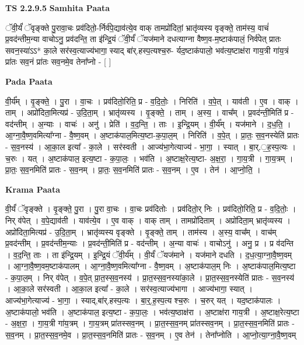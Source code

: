 \documentclass[17pt]{extarticle}
\begin{document}
\textbf{TS 2.2.9.5 } \newline
\textbf{Samhita Paata} \newline

ॅवी॒र्यं॑ ॅवृङ्क्ते पु॒रावा॒चः प्रव॑दितो॒-र्निर्व॑पे॒द्याव॑त्ये॒व वाक् तामप्रो॑दितां॒ भ्रातृ॑व्यस्य वृङ्क्ते॒ ताम॑स्य॒ वाचं॑ प्र॒वद॑न्तीम॒न्या वाचोऽनु॒ प्रव॑दन्ति॒ ता इ॑न्द्रि॒यं ॅवी॒र्यं॑ ॅयज॑माने दधत्याग्ना वैष्ण॒व-म॒ष्टाक॑पालं॒ निर्व॑पेत् प्रातः सवन॒स्या॑ऽऽ* का॒ले सर॑स्व॒त्याज्य॑भागा॒ स्याद् बा॑र्.हस्प॒त्यश्च॒रु- र्यद॒ष्टाक॑पालो॒ भव॑त्य॒ष्टाक्ष॑रा गाय॒त्री गा॑य॒त्रं प्रा॑तः सव॒नं प्रा॑तः सव॒नमे॒व तेना᳚प्नो - [  ] \newline

\textbf{Pada Paata} \newline

वी॒र्य᳚म् । वृ॒ङ्क्ते॒ । पु॒रा । वा॒चः । प्रव॑दितो॒रिति॒ प्र - व॒दि॒तोः॒ । निरिति॑ । व॒पे॒त् । याव॑ती । ए॒व । वाक् । ताम् । अप्रो॑दिता॒मित्यप्र॑ - उ॒दि॒ता॒म् । भ्रातृ॑व्यस्य । वृ॒ङ्क्ते॒ । ताम् । अ॒स्य॒ । वाच᳚म् । प्र॒वद॑न्ती॒मिति॑ प्र - वद॑न्तीम् । अ॒न्याः । वाचः॑ । अनु॑ । प्रेति॑ । व॒द॒न्ति॒ । ताः । इ॒न्द्रि॒यम् । वी॒र्य᳚म् । यज॑माने । द॒ध॒ति॒ । आ॒ग्ना॒वै॒ष्ण॒वमित्या᳚ग्ना - वै॒ष्ण॒वम् । अ॒ष्टाक॑पाल॒मित्य॒ष्टा-क॒पा॒ल॒म् । निरिति॑ । व॒पे॒त् । प्रा॒तः॒ स॒व॒नस्येति॑ प्रातः - स॒व॒नस्य॑ । आ॒का॒ल इत्या᳚ - का॒ले । सर॑स्वती । आज्य॑भा॒गेत्याज्य॑ - भा॒गा॒ । स्यात् । बा॒र्.॒ह॒स्प॒त्यः । च॒रुः । यत् । अ॒ष्टाक॑पाल॒ इत्य॒ष्टा - क॒पा॒लः॒ । भव॑ति । अ॒ष्टाक्ष॒रेत्य॒ष्टा- अ॒क्ष॒रा॒ । गा॒य॒त्री । गा॒य॒त्रम् । प्रा॒तः॒ स॒व॒नमिति॑ प्रातः - स॒व॒नम् । प्रा॒तः॒ स॒व॒नमिति॑ प्रातः - स॒व॒नम् । ए॒व । तेन॑ । आ॒प्नो॒ति॒ ।  \newline


\textbf{Krama Paata} \newline

वी॒र्यं॑ ॅवृङ्क्ते । वृ॒ङ्क्ते॒ पु॒रा । पु॒रा वा॒चः । वा॒चः प्रव॑दितोः । प्रव॑दितो॒र् निः । प्रव॑दितो॒रिति॒ प्र - व॒दि॒तोः॒ । निर् व॑पेत् । व॒पे॒द्याव॑ती । याव॑त्ये॒व । ए॒व वाक् । वाक् ताम् । तामप्रो॑दिताम् । अप्रो॑दिता॒म् भ्रातृ॑व्यस्य । अप्रो॑दिता॒मित्यप्र॑ - उ॒दि॒ता॒म् । भ्रातृ॑व्यस्य वृङ्क्ते । वृ॒ङ्क्ते॒ ताम् । ताम॑स्य । अ॒स्य॒ वाच᳚म् । वाच॑म् प्र॒वद॑न्तीम् । प्र॒वद॑न्तीम॒न्याः । प्र॒वद॑न्ती॒मिति॑ प्र - वद॑न्तीम् । अ॒न्या वाचः॑ । वाचोऽनु॑ । अनु॒ प्र । प्र व॑दन्ति । व॒द॒न्ति॒ ताः । ता इ॑न्द्रि॒यम् । इ॒न्द्रि॒यं ॅवी॒र्य᳚म् । वी॒र्यं॑ ॅयज॑माने । यज॑माने दधति । द॒ध॒त्या॒ग्ना॒वै॒ष्ण॒वम् । आ॒ग्ना॒वै॒ष्ण॒वम॒ष्टाक॑पालम् । आ॒ग्ना॒वै॒ष्ण॒वमित्या᳚ग्ना - वै॒ष्ण॒वम् । अ॒ष्टाक॑पाल॒म् निः । अ॒ष्टाक॑पाल॒मित्य॒ष्टा - क॒पा॒ल॒म् । निर् व॑पेत् । व॒पे॒त् प्रा॒त॒स्स॒व॒नस्य॑ । प्रा॒त॒स्स॒व॒नस्या॑का॒ले । प्रा॒त॒स्स॒व॒नस्येति॑ प्रातः - स॒व॒नस्य॑ । आ॒का॒ले सर॑स्वती । आ॒का॒ल इत्या᳚ - का॒ले । सर॑स्व॒त्याज्य॑भागा । आज्य॑भागा॒ स्यात् । आज्य॑भा॒गेत्याज्य॑ - भा॒गा॒ । स्याद्,बा॑र्.हस्प॒त्यः । बा॒र्॒.ह॒स्प॒त्य श्च॒रुः । च॒रुर् यत् । यद॒ष्टाक॑पालः । अ॒ष्टाक॑पालो॒ भव॑ति । अ॒ष्टाक॑पाल॒ इत्य॒ष्टा - क॒पा॒लः॒ । भव॑त्य॒ष्ठाक्ष॑रा । अ॒ष्टाक्ष॑रा गाय॒त्री । अ॒ष्टाक्ष॒रेत्य॒ष्टा - अ॒क्ष॒रा॒ । गा॒य॒त्री गा॑य॒त्रम् । गा॒य॒त्रम् प्रा॑तस्सव॒नम् । प्रा॒त॒स्स॒व॒नम् प्रा॑तस्सव॒नम् । प्रा॒त॒स्स॒व॒नमिति॑ प्रातः - स॒व॒नम् । प्रा॒त॒स्स॒व॒नमे॒व । प्रा॒त॒स्स॒व॒नमिति॑ प्रातः - स॒व॒नम् । ए॒व तेन॑ । तेना᳚प्नोति । आ॒प्नो॒त्या॒ग्ना॒वै॒ष्ण॒वम् \newline
\end{document}
